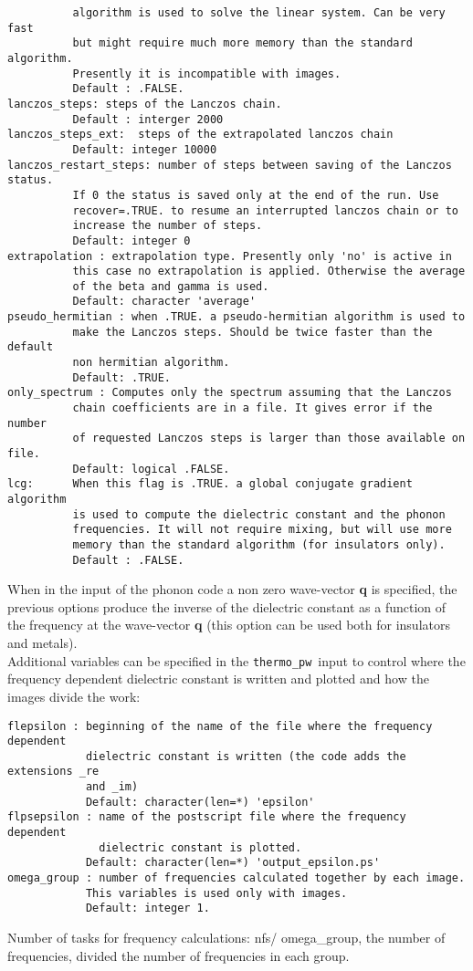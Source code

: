 \documentclass[12pt,a4paper]{article}
\def\thermo{\texttt{thermo\_pw}}
\begin{document}
\begin{verbatim}
          algorithm is used to solve the linear system. Can be very fast 
          but might require much more memory than the standard algorithm.
          Presently it is incompatible with images.
          Default : .FALSE.
lanczos_steps: steps of the Lanczos chain.
          Default : interger 2000
lanczos_steps_ext:  steps of the extrapolated lanczos chain
          Default: integer 10000
lanczos_restart_steps: number of steps between saving of the Lanczos status.
          If 0 the status is saved only at the end of the run. Use 
          recover=.TRUE. to resume an interrupted lanczos chain or to
          increase the number of steps.
          Default: integer 0
extrapolation : extrapolation type. Presently only 'no' is active in 
          this case no extrapolation is applied. Otherwise the average
          of the beta and gamma is used.
          Default: character 'average'
pseudo_hermitian : when .TRUE. a pseudo-hermitian algorithm is used to 
          make the Lanczos steps. Should be twice faster than the default
          non hermitian algorithm.
          Default: .TRUE.
only_spectrum : Computes only the spectrum assuming that the Lanczos
          chain coefficients are in a file. It gives error if the number
          of requested Lanczos steps is larger than those available on file.
          Default: logical .FALSE.
lcg:      When this flag is .TRUE. a global conjugate gradient algorithm
          is used to compute the dielectric constant and the phonon 
          frequencies. It will not require mixing, but will use more
          memory than the standard algorithm (for insulators only).
          Default : .FALSE.
\end{verbatim}
When in the input of the phonon code a non zero wave-vector {\bf q}
is specified, the previous options produce the inverse of the dielectric 
constant as a function of the frequency at the wave-vector {\bf q}
(this option can be used both for insulators and metals). \\
Additional variables can be specified in the \thermo\ input to control
where the frequency dependent dielectric constant is written and plotted
and how the images divide the work:
\begin{verbatim}
flepsilon : beginning of the name of the file where the frequency dependent 
            dielectric constant is written (the code adds the extensions _re
            and _im)
            Default: character(len=*) 'epsilon'
flpsepsilon : name of the postscript file where the frequency dependent 
              dielectric constant is plotted.
            Default: character(len=*) 'output_epsilon.ps'
omega_group : number of frequencies calculated together by each image.
            This variables is used only with images.
            Default: integer 1.
\end{verbatim}
Number of tasks for frequency calculations: nfs/ omega\_group, the 
number of frequencies, divided the number of frequencies in each group.
\end{document}
